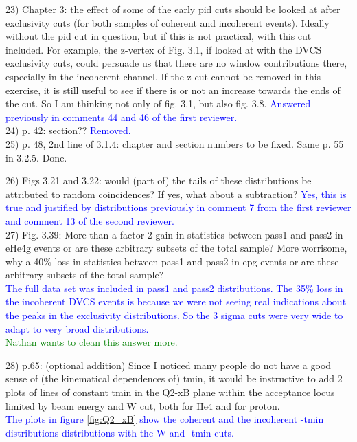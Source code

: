 23) Chapter 3: the effect of some of the early pid cuts should be looked at after 
exclusivity cuts (for both samples of coherent and incoherent events). Ideally 
without the pid cut in question, but if this is not practical, with this cut 
included. For example, the z-vertex of Fig. 3.1, if looked at with the DVCS 
exclusivity cuts, could persuade us that there are no window contributions 
there, especially in the incoherent channel. If the z-cut cannot be removed in 
this exercise, it is still useful to see if there is or not an increase towards 
the ends of the cut. So I am thinking not only of fig. 3.1, but also fig. 3.8.
\textcolor{blue}{ Answered previously in comments 44 and 46 of the first 
reviewer.}\\

24) p. 42: section??
\textcolor{blue}{ Removed.}\\
 
25) p. 48, 2nd line of 3.1.4: chapter and section numbers to be fixed. Same p. 55 
in 3.2.5.
 Done.

26) Figs 3.21 and 3.22: would (part of) the tails of these distributions be 
attributed to random coincidences? If yes, what about a subtraction?
\textcolor{blue}{Yes, this is true and justified by distributions previously in 
comment 7 from the first reviewer and comment 13 of the second reviewer.}\\

27) Fig. 3.39: More than a factor 2 gain in statistics between pass1 and pass2 in 
eHe4g events or are these arbitrary subsets of the total sample? More 
worrisome, why a 40$\%$ loss in statistics between pass1 and pass2 in epg 
events or are these arbitrary subsets of the total sample?\\
\textcolor{blue}{
The full data set was included in pass1 and pass2 distributions. The 35$\%$ 
loss in the incoherent DVCS events is because we were not seeing real 
indications about the peaks in the exclusivity distributions. So the 3 sigma 
cuts were very wide to adapt to very broad distributions. }\\
\textcolor{green}{Nathan wants to clean this answer more.}

28) p.65: (optional addition) Since I noticed many people do not have a good 
sense of (the kinematical dependences of) tmin, it would be instructive to add 
2 plots of lines of constant tmin in the Q2-xB plane within the acceptance 
locus limited by beam energy and W cut, both for He4 and for proton.\\
\textcolor{blue}{
   The plots in figure \ref{fig:Q2_xB} show the coherent and the incoherent 
-tmin distributions distributions with the W and -tmin cuts. }\\ 

